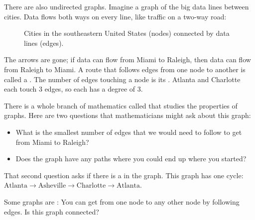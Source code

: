 There are also undirected graphs. Imagine a graph of the big data lines
between cities. Data flows both ways on every line, like traffic on a
two-way road:
\begin{figure}[H]
  \centering
  \caption{Cities in the southeastern United States (nodes) connected by data lines (edges).}
  \label{fig:east_coast1}
\end{figure}

The arrows are gone; if data can flow from Miami to Raleigh, then
data can flow from Raleigh to Miami. A route that follows edges from one
node to another is called a . The number of edges touching
a node is its . Atlanta and Charlotte each touch 3 edges, so each has a
degree of 3.


There is a whole branch of mathematics called 
that studies the properties of graphs. Here are two questions that mathematicians
might ask about this graph:
\begin{itemize}
  \item What is the smallest number of edges that we would need to follow to get from Miami to Raleigh?
  \item Does the graph have any paths where you could end up where you
        started?
\end{itemize}

That second question asks if there is a  in the graph. This graph has one
cycle: $\text{Atlanta} \rightarrow \text{Asheville} \rightarrow \text{Charlotte}
  \rightarrow \text{Atlanta}$.

Some graphs are : You can get from one node to any
other node by following edges. Is this graph connected?

